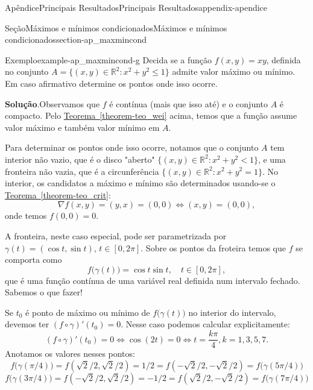 \documentclass[oneside,10pt,]{book}
\newcommand{\blocktitlefont}{\relax}
\newcommand{\xreffont}{\relax}
\numberwithin{equation}{section}
\newcommand{\R}{\mathbb R}
\begin{document}
\begin{appendixptx}{Apêndice}{Principais Resultados}{}{Principais Resultados}{}{}{appendix-apendice}
\begin{sectionptx}{Seção}{Máximos e mínimos condicionados}{}{Máximos e mínimos condicionados}{}{}{section-ap_maxmincond}
\begin{example}{Exemplo}{}{example-ap_maxmincond-g}%
Decida se a função \(f(x,y)=xy\), definida no conjunto \(A=\big\{(x,y)\in\R^2\colon x^2+y^2\leq 1\big\}\) admite valor máximo ou mínimo. Em caso afirmativo determine os pontos onde isso ocorre.\par\smallskip%
\noindent\textbf{\blocktitlefont Solução}.\hypertarget{solution-ap_maxmincond-g-b}{}\quad{}Observamos que \(f\) é contínua (mais que isso até) e o conjunto \(A\) é compacto. Pelo \hyperref[theorem-teo_wei]{Teorema~{\xreffont\ref{theorem-teo_wei}}} acima, temos que a função assume valor máximo e também valor mínimo em \(A\).%
\par
Para determinar os pontos onde isso ocorre, notamos que o conjunto \(A\) tem interior não vazio, que é o disco "aberto" \(\big\{(x,y)\in\R^2\colon x^2+y^2< 1\big\}\),  e uma fronteira não vazia, que é a circunferência \(\big\{(x,y)\in\R^2\colon
x^2+y^2= 1\big\}\). No interior, os candidatos a máximo e mínimo são determinados usando-se o \hyperref[theorem-teo_crit]{Teorema~{\xreffont\ref{theorem-teo_crit}}}:%
\begin{equation*}
\nabla
f(x,y)=(y,x)=(0,0)\iff (x,y)=(0,0),
\end{equation*}
onde temos \(\boxed{f(0,0)=0}\).%
\par
A fronteira, neste caso especial, pode ser parametrizada por \(\gamma(t)=(\cos t, \sin t)\), \(t\in [0,2\pi]\). Sobre os pontos da froteira temos que \(f\) se comporta como%
\begin{equation*}
f\big(\gamma(t)\big)=\cos t \sin t, \quad t\in [0,2\pi],
\end{equation*}
que é uma função contínua de uma variável real definida num intervalo fechado. Sabemos o que fazer!%
\par
Se \(t_0\) é ponto de máximo ou mínimo de \(f\big(\gamma(t)\big)\) no interior do intervalo, devemos ter \((f\circ\gamma)'(t_0)=0\). Nesse caso podemos calcular explicitamente:%
\begin{equation*}
(f\circ\gamma)'(t_0)=0\iff\cos(2t)=0\iff
t=\dfrac{k\pi}{4}, k=1,3,5,7.
\end{equation*}
Anotamos os valores nesses pontos:%
\begin{equation*}
f\big(\gamma(\pi/4)\big)=\boxed{f(\sqrt{2}/2,\sqrt{2}/2)=1/2=f(-\sqrt{2}/2,-\sqrt{2}/2)}=f\big(\gamma(5\pi/4)\big)
\end{equation*}
%
\begin{equation*}
f\big(\gamma(3\pi/4)\big)=\boxed{f(-\sqrt{2}/2,\sqrt{2}/2)=-1/2=f(\sqrt{2}/2,-\sqrt{2}/2)}=f\big(\gamma(7\pi/4)\big)

\end{equation*}
\end{example}
\end{sectionptx}
\end{appendixptx}
\end{document}
